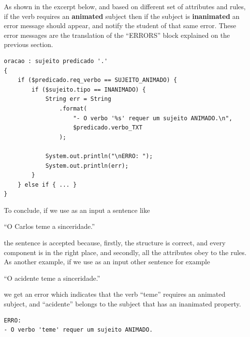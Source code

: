 As shown in the excerpt below, and based on different set of attributes and rules, if the verb requires an \textbf{animated} subject then if the subject is \textbf{inanimated} an error message should appear, and notify the student of that same error. These error messages are the translation of the ``ERRORS'' block explained on the previous section.

\begin{center}
\begin{minipage}{14cm}
\begin{Verbatim}[frame=single, framesep=2mm, fontsize=\small]
oracao : sujeito predicado '.'
{
    if ($predicado.req_verbo == SUJEITO_ANIMADO) {
        if ($sujeito.tipo == INANIMADO) {
            String err = String
                .format(
                    "- O verbo '%s' requer um sujeito ANIMADO.\n",
                    $predicado.verbo_TXT
                );

            System.out.println("\nERRO: ");
            System.out.println(err);
        }
    } else if { ... }
}
\end{Verbatim}
\end{minipage}
\end{center}


To conclude, if we use as an input a sentence like

``O Carlos teme a sinceridade.''

\noindent the sentence is accepted because, firstly, the structure is correct, and every component is in the right place, and secondly, all the attributes obey to the rules. As another example, if we use as an input other sentence for example

``O acidente teme a sinceridade.''

\noindent we get an error which indicates that the verb ``teme'' requires an animated subject, and ``acidente'' belongs to the subject that has an inanimated property.

\begin{center}
\begin{minipage}{9cm}
\begin{Verbatim}[frame=single, framesep=2mm, fontsize=\small]
ERRO:
- O verbo 'teme' requer um sujeito ANIMADO.
\end{Verbatim}
\end{minipage}
\end{center}

